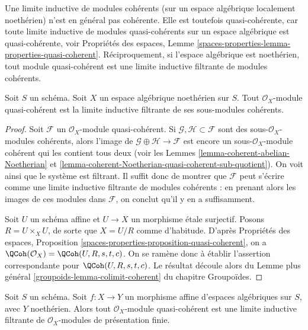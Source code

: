 \noindent
Une limite inductive de modules cohérents (sur un espace algébrique
localement noethérien) n'est en général pas cohérente. Elle est toutefois quasi-cohérente,
car toute limite inductive de modules quasi-cohérents sur un espace algébrique est
quasi-cohérente, voir Propriétés des espaces, Lemme
\ref{spaces-properties-lemma-properties-quasi-coherent}.
Réciproquement, si l'espace algébrique est noethérien, tout module quasi-cohérent
est une limite inductive filtrante de modules cohérents.

\begin{lemma}
\label{lemma-directed-colimit-coherent}
Soit $S$ un schéma. Soit $X$ un espace algébrique noethérien sur $S$.
Tout $\mathcal{O}_X$-module quasi-cohérent est la limite inductive filtrante
de ses sous-modules cohérents.
\end{lemma}

\begin{proof}
Soit $\mathcal{F}$ un $\mathcal{O}_X$-module quasi-cohérent.
Si $\mathcal{G}, \mathcal{H} \subset \mathcal{F}$ sont des
sous-$\mathcal{O}_X$-modules cohérents, alors l'image de
$\mathcal{G} \oplus \mathcal{H} \to \mathcal{F}$ est encore un
sous-$\mathcal{O}_X$-module cohérent qui les contient tous deux
(voir les Lemmes \ref{lemma-coherent-abelian-Noetherian} et
\ref{lemma-coherent-Noetherian-quasi-coherent-sub-quotient}).
On voit ainsi que le système est filtrant.
Il suffit donc de montrer que $\mathcal{F}$ peut s'écrire comme
une limite inductive filtrante de modules cohérents : en prenant alors les
images de ces modules dans $\mathcal{F}$, on conclut qu'il y en a
suffisamment.

\medskip\noindent
Soit $U$ un schéma affine et $U \to X$ un morphisme \'etale surjectif.
Posons $R = U \times_X U$, de sorte que $X = U/R$ comme d'habitude. D'après
Propriétés des espaces, Proposition
\ref{spaces-properties-proposition-quasi-coherent},
on a $\QCoh(\mathcal{O}_X) = \QCoh(U, R, s, t, c)$.
On se ramène donc à établir l'assertion correspondante pour
$\QCoh(U, R, s, t, c)$. Le résultat découle alors du
Lemme plus général \ref{groupoids-lemma-colimit-coherent} du chapitre Groupoïdes.
\end{proof}

\begin{lemma}
\label{lemma-direct-colimit-finite-presentation}
Soit $S$ un schéma. Soit $f : X \to Y$ un morphisme affine d'espaces
algébriques sur $S$, avec $Y$ noethérien. Alors tout
$\mathcal{O}_X$-module quasi-cohérent est une limite inductive filtrante de
$\mathcal{O}_X$-modules de présentation finie.
\end{lemma}

